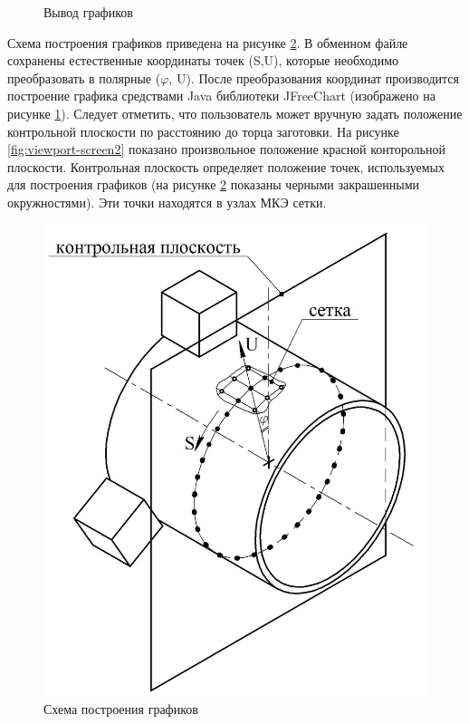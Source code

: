 \documentclass[14pt,oneside,final]{extreport}
\begin{document}
\begin{figure}[b!]
\begin{minipage}[b!]{0.5\textwidth}
			\caption{Вывод графиков}
			\label{fig:graph-screen}	
		\end{minipage}
	\end{figure}
	
	Схема построения графиков приведена на рисунке \ref{fig:control-plane}. В обменном файле сохранены естественные координаты точек (S,U), которые необходимо преобразовать в полярные ($ \varphi $, U).
	После преобразования координат производится построение графика средствами Java библиотеки JFreeChart (изображено на рисунке \ref{fig:graph-screen}). Следует отметить, что пользователь может вручную задать  положение контрольной плоскости по расстоянию до торца заготовки. На рисунке  \ref{fig:viewport-screen2} показано произвольное положение красной конторольной плоскости. Контрольная плоскость определяет положение точек, используемых для построения графиков (на рисунке \ref{fig:control-plane} показаны черными закрашенными окружностями). Эти точки находятся в узлах МКЭ сетки. 
	\begin{figure}[!h]
		\begin{center}
			\includegraphics[scale=1]{img/control-plane} 
		\end{center}
		\caption{Схема построения графиков}
		\label{fig:control-plane}
	\end{figure}	
	
\end{document}
